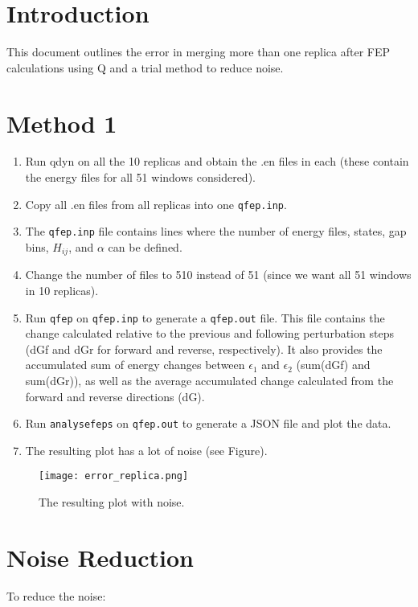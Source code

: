 \documentclass{article}
\begin{document}
\section{Introduction}
This document outlines the error in merging more than one replica after FEP calculations using Q and a trial method to reduce noise.

\section{Method 1}

\begin{enumerate}
    \item Run qdyn on all the 10 replicas and obtain the .en files in each (these contain the energy files for all 51 windows considered).
    \item Copy all .en files from all replicas into one \texttt{qfep.inp}.
    \item The \texttt{qfep.inp} file contains lines where the number of energy files, states, gap bins, \(H_{ij}\), and \(\alpha\) can be defined.
    \item Change the number of files to 510 instead of 51 (since we want all 51 windows in 10 replicas).
    \item Run \texttt{qfep} on \texttt{qfep.inp} to generate a \texttt{qfep.out} file. This file contains the change calculated relative to the previous and following perturbation steps (dGf and dGr for forward and reverse, respectively). It also provides the accumulated sum of energy changes between \(\epsilon_1\) and \(\epsilon_2\) (sum(dGf) and sum(dGr)), as well as the average accumulated change calculated from the forward and reverse directions (dG).
    \item Run \texttt{analysefeps} on \texttt{qfep.out} to generate a JSON file and plot the data.
    \item The resulting plot has a lot of noise (see Figure).
\end{enumerate}

\begin{figure}[h] %
    \centering
    \texttt{[image: error\_replica.png]} %
    \caption{The resulting plot with noise.}
    \label{fig:noise}
\end{figure}

\section{Noise Reduction}
To reduce the noise:
\end{document}
